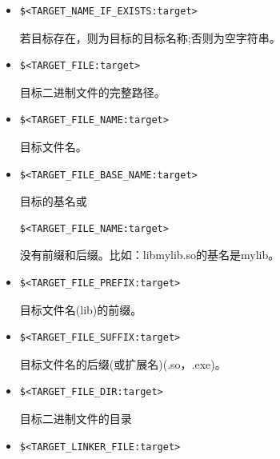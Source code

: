 \begin{itemize}
\item 
\begin{lstlisting}[style=styleCMake]
$<TARGET_NAME_IF_EXISTS:target>
\end{lstlisting}

若目标存在，则为目标的目标名称;否则为空字符串。

\item 
\begin{lstlisting}[style=styleCMake]
$<TARGET_FILE:target>
\end{lstlisting}

目标二进制文件的完整路径。

\item 
\begin{lstlisting}[style=styleCMake]
$<TARGET_FILE_NAME:target>
\end{lstlisting}

目标文件名。

\item 
\begin{lstlisting}[style=styleCMake]
$<TARGET_FILE_BASE_NAME:target>
\end{lstlisting}

目标的基名或

\begin{lstlisting}[style=styleCMake]
$<TARGET_FILE_NAME:target>
\end{lstlisting}

没有前缀和后缀。比如：libmylib.so的基名是mylib。

\item 
\begin{lstlisting}[style=styleCMake]
$<TARGET_FILE_PREFIX:target> 
\end{lstlisting}

目标文件名(lib)的前缀。

\item 
\begin{lstlisting}[style=styleCMake]
$<TARGET_FILE_SUFFIX:target>
\end{lstlisting}

目标文件名的后缀(或扩展名)(.so，.exe)。

\item 
\begin{lstlisting}[style=styleCMake]
$<TARGET_FILE_DIR:target>
\end{lstlisting}

目标二进制文件的目录

\item 
\begin{lstlisting}[style=styleCMake]
$<TARGET_LINKER_FILE:target>
\end{lstlisting}


\end{itemize}

